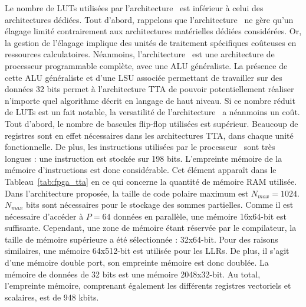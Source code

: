 Le nombre de LUTs utilisées par l'architecture \TTSC~est inférieur à celui des architectures dédiées. Tout d'abord, rappelons que l'architecture \TTSC~ne gère qu'un élagage limité contrairement aux architectures matérielles dédiées considérées. Or, la gestion de l'élagage implique des unités de traitement spécifiques coûteuses en ressources calculatoires. Néanmoins, l'architecture \TTSC~est une architecture de processeur programmable complète, avec une ALU généraliste. La présence de cette ALU généraliste et d'une LSU associée permettant de travailler sur des données 32 bits permet à l'architecture TTA de pouvoir potentiellement réaliser n'importe quel algorithme décrit en langage de haut niveau. Si ce nombre réduit de LUTs est un fait notable, la versatilité de l'architecture \TTSC~a néanmoins un coût. Tout d'abord, le nombre de bascules flip-flop utilisées est supérieur. Beaucoup de registres sont en effet nécessaires dans les architectures TTA, dans chaque unité fonctionnelle. De plus, les instructions utilisées par le processeur \TTSC~sont très longues : une instruction est stockée sur 198 bits. L'empreinte mémoire de la mémoire d'instructions est donc considérable. Cet élément apparaît dans le Tableau~\ref{tab:fpga_tta} en ce qui concerne la quantité de mémoire RAM utilisée. Dans l'architecture proposée, la taille de code polaire maximum est $N_{max}=1024$. $N_{max}$ bits sont nécessaires pour le stockage des sommes partielles. Comme il est nécessaire d'accéder à $P=64$ données en parallèle, une mémoire 16x64-bit est suffisante. Cependant, une zone de mémoire étant réservée par le compilateur, la taille de mémoire supérieure a été sélectionnée : 32x64-bit. Pour des raisons similaires, une mémoire 64x512-bit est utilisée pour les LLRs. De plus, il s'agit d'une mémoire double port, son empreinte mémoire est donc doublée. La mémoire de données de 32 bits est une mémoire 2048x32-bit. Au total, l'empreinte mémoire, comprenant également les différents registres vectoriels et scalaires, est de 948 kbits.




